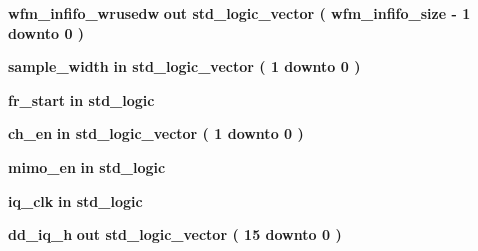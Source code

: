 \begin{DoxyCompactItemize}
\item 
{\bf wfm\+\_\+infifo\+\_\+wrusedw}  {\bfseries {\bfseries \textcolor{keywordflow}{out}\textcolor{vhdlchar}{ }}} {\bfseries \textcolor{comment}{std\+\_\+logic\+\_\+vector}\textcolor{vhdlchar}{ }\textcolor{vhdlchar}{(}\textcolor{vhdlchar}{ }\textcolor{vhdlchar}{ }\textcolor{vhdlchar}{ }\textcolor{vhdlchar}{ }{\bfseries {\bf wfm\+\_\+infifo\+\_\+size}} \textcolor{vhdlchar}{-\/}\textcolor{vhdlchar}{ } \textcolor{vhdldigit}{1} \textcolor{vhdlchar}{ }\textcolor{keywordflow}{downto}\textcolor{vhdlchar}{ }\textcolor{vhdlchar}{ } \textcolor{vhdldigit}{0} \textcolor{vhdlchar}{ }\textcolor{vhdlchar}{)}\textcolor{vhdlchar}{ }} 
\item 
{\bf sample\+\_\+width}  {\bfseries {\bfseries \textcolor{keywordflow}{in}\textcolor{vhdlchar}{ }}} {\bfseries \textcolor{comment}{std\+\_\+logic\+\_\+vector}\textcolor{vhdlchar}{ }\textcolor{vhdlchar}{(}\textcolor{vhdlchar}{ }\textcolor{vhdlchar}{ } \textcolor{vhdldigit}{1} \textcolor{vhdlchar}{ }\textcolor{keywordflow}{downto}\textcolor{vhdlchar}{ }\textcolor{vhdlchar}{ } \textcolor{vhdldigit}{0} \textcolor{vhdlchar}{ }\textcolor{vhdlchar}{)}\textcolor{vhdlchar}{ }} 
\item 
{\bf fr\+\_\+start}  {\bfseries {\bfseries \textcolor{keywordflow}{in}\textcolor{vhdlchar}{ }}} {\bfseries \textcolor{comment}{std\+\_\+logic}\textcolor{vhdlchar}{ }} 
\item 
{\bf ch\+\_\+en}  {\bfseries {\bfseries \textcolor{keywordflow}{in}\textcolor{vhdlchar}{ }}} {\bfseries \textcolor{comment}{std\+\_\+logic\+\_\+vector}\textcolor{vhdlchar}{ }\textcolor{vhdlchar}{(}\textcolor{vhdlchar}{ }\textcolor{vhdlchar}{ } \textcolor{vhdldigit}{1} \textcolor{vhdlchar}{ }\textcolor{keywordflow}{downto}\textcolor{vhdlchar}{ }\textcolor{vhdlchar}{ } \textcolor{vhdldigit}{0} \textcolor{vhdlchar}{ }\textcolor{vhdlchar}{)}\textcolor{vhdlchar}{ }} 
\item 
{\bf mimo\+\_\+en}  {\bfseries {\bfseries \textcolor{keywordflow}{in}\textcolor{vhdlchar}{ }}} {\bfseries \textcolor{comment}{std\+\_\+logic}\textcolor{vhdlchar}{ }} 
\item 
{\bf iq\+\_\+clk}  {\bfseries {\bfseries \textcolor{keywordflow}{in}\textcolor{vhdlchar}{ }}} {\bfseries \textcolor{comment}{std\+\_\+logic}\textcolor{vhdlchar}{ }} 
\item 
{\bf dd\+\_\+iq\+\_\+h}  {\bfseries {\bfseries \textcolor{keywordflow}{out}\textcolor{vhdlchar}{ }}} {\bfseries \textcolor{comment}{std\+\_\+logic\+\_\+vector}\textcolor{vhdlchar}{ }\textcolor{vhdlchar}{(}\textcolor{vhdlchar}{ }\textcolor{vhdlchar}{ } \textcolor{vhdldigit}{15} \textcolor{vhdlchar}{ }\textcolor{keywordflow}{downto}\textcolor{vhdlchar}{ }\textcolor{vhdlchar}{ } \textcolor{vhdldigit}{0} \textcolor{vhdlchar}{ }\textcolor{vhdlchar}{)}\textcolor{vhdlchar}{ }} 

\end{DoxyCompactItemize}
